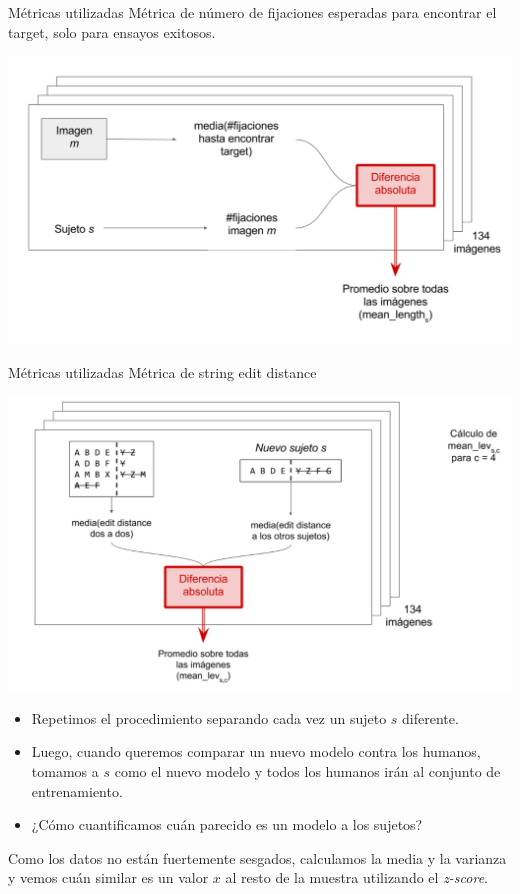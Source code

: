\documentclass[compress]{beamer}
\begin{document}
\begin{frame}{Métricas utilizadas}
{Métrica de número de fijaciones esperadas para
encontrar el target, solo para ensayos exitosos.}

\begin{center}
\includegraphics[width=\textwidth]{images/mean_length_explanation.png}
\end{center}
\end{frame}

\begin{frame}{Métricas utilizadas}
{Métrica de string edit distance}

\begin{center}
\includegraphics[width=\textwidth]{images/edit_distance_explanation.png}
\end{center}
\end{frame}

\begin{frame}
\begin{itemize}
\item Repetimos el procedimiento separando cada vez un sujeto $s$ diferente.
\item Luego, cuando queremos comparar un nuevo modelo contra los humanos, tomamos a $s$ como el nuevo modelo y todos los humanos irán al conjunto de entrenamiento.
\item ¿Cómo cuantificamos cuán parecido es un modelo a los sujetos?
\end{itemize}

\bigskip
\pause

Como los datos no están fuertemente sesgados, calculamos la media y la varianza y vemos cuán similar es un valor $x$ al resto de la muestra utilizando el \textit{z-score}.

\end{frame}
\end{document}
